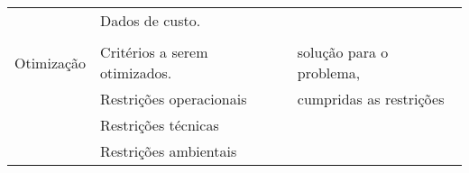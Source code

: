 \begin{table}[ht]
\begin{tabular}{l l l}
                           & Dados de custo.                                 &                                         \\
                           &                                                 &                                         \\
   Otimização              & Critérios a serem otimizados.                   &         solução       para o problema,  \\
                           & Restrições operacionais                         & cumpridas as restrições                 \\
                           & Restrições               técnicas               &                                         \\
                           & Restrições                          ambientais  &                                         \\
          \hline
  \end{tabular}
\end{table}
